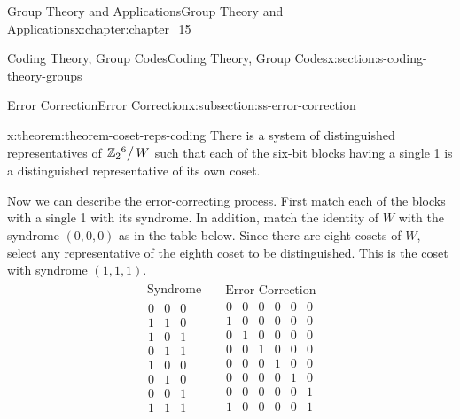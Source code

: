 \documentclass[twoside,10pt,]{book}
\numberwithin{equation}{section}
\begin{document}
\begin{chapterptx}{Group Theory and Applications}{}{Group Theory and Applications}{}{}{x:chapter:chapter_15}
\begin{sectionptx}{Coding Theory, Group Codes}{}{Coding Theory, Group Codes}{}{}{x:section:s-coding-theory-groups}
\begin{subsectionptx}{Error Correction}{}{Error Correction}{}{}{x:subsection:ss-error-correction}
\begin{theorem}{}{}{x:theorem:theorem-coset-reps-coding}%
There is a system of distinguished representatives of \(\left.\mathbb{Z}_2{}^6\right/W\) such that each of the six-bit blocks having a single 1 is a distinguished representative of its own coset.%
\end{theorem}
Now we can describe the error-correcting process. First match each of the blocks with a single 1 with its syndrome. In addition, match the identity of \(W\) with the syndrome \((0, 0, 0)\) as in the table below. Since there are eight cosets of \(W\), select any representative of the eighth coset to be distinguished. This is the coset with syndrome \((1, 1, 1)\).%
\begin{equation*}
\begin{array}{c|c}
\begin{array}{c}
\textrm{ Syndrome} \\
\hline
\begin{array}{ccc}
0 & 0 & 0 \\
1 & 1 & 0 \\
1 & 0 & 1 \\
0 & 1 & 1 \\
1 & 0 & 0 \\
0 & 1 & 0 \\
0 & 0 & 1 \\
1 & 1 & 1 \\
\end{array}
\\
\end{array}
& 	  
\begin{array}{c}
\textrm{ Error} \textrm{ Correction} \\
\hline
\begin{array}{cccccc}
0 & 0 & 0 & 0 & 0 & 0 \\
1 & 0 & 0 & 0 & 0 & 0 \\
0 & 1 & 0 & 0 & 0 & 0 \\
0 & 0 & 1 & 0 & 0 & 0 \\
0 & 0 & 0 & 1 & 0 & 0 \\
0 & 0 & 0 & 0 & 1 & 0 \\
0 & 0 & 0 & 0 & 0 & 1 \\
1 & 0 & 0 & 0 & 0 & 1 \\
\end{array}
\\
\end{array}
\\
\end{array}
\end{equation*}

\end{subsectionptx}
\end{sectionptx}
\end{chapterptx}
\end{document}

